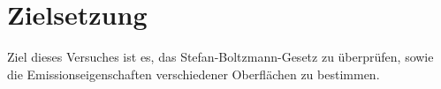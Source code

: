 \section{Zielsetzung}
\label{sec:Zielsetzung}
Ziel dieses Versuches ist es, das Stefan-Boltzmann-Gesetz zu überprüfen, sowie die
Emissionseigenschaften verschiedener Oberflächen zu bestimmen.
